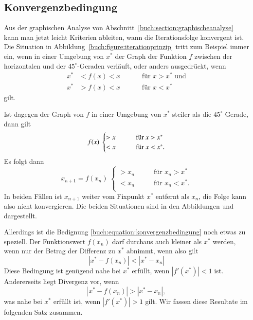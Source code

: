 %
%
\subsection{Konvergenzbedingung
\label{buch:subsection:konvergenzbedingung}}


Aus der graphischen Analyse von Abschnitt~\ref{buch:section:graphischeanalyse}
kann man jetzt leicht Kriterien ableiten, wann die Iterationsfolge
konvergent ist.
Die Situation in Abbildung~\ref{buch:figure:iterationprinzip}
tritt zum Beispiel immer ein, wenn in einer Umgebung von $x^*$ 
der Graph der Funktion $f$ zwischen der horizontalen und der 
$45^\circ$-Geraden verläuft, oder anders ausgedrückt, wenn
\[
\begin{aligned}
x^* &< f(x) < x &&& &\text{für $x>x^*$ und} \\
x^* &> f(x) < x &&& &\text{für $x<x^*$}
\end{aligned}
\]
gilt.

Ist dagegen der Graph von $f$ in einer Umgebung von $x^*$ steiler als
die $45^\circ$-Gerade, dann gilt 
\begin{equation}
f(x) \;\begin{cases}
> x&\qquad\text{für $ x>x^*$}\\
< x&\qquad\text{für $ x<x^*$.}
\end{cases}
\label{buch:equation:konvergenzbedingung}
\end{equation}
Es folgt dann
\[
x_{n+1} = f(x_n)
\;
\begin{cases}
> x_n&\qquad \text{für $x_n>x^*$}\\
< x_n&\qquad \text{für $x_n<x^*$.}\\
\end{cases}
\]
In beiden Fällen ist $x_{n+1}$ weiter vom Fixpunkt $x^*$ entfernt
als $x_n$, die Folge kann also nicht konvergieren.
Die beiden Situationen sind in den Abbildungen
\label{buch:figure:fixpunkt:normal} und
\label{buch:figure:fixpunkt:divergent}
dargestellt.

Allerdings ist die Bedignung \ref{buch:equation:konvergenzbedingung}
noch etwas zu speziell.
Der Funktionswert $f(x_n)$ darf durchaus auch kleiner als $x^*$ werden,
wenn nur der Betrag der Differenz zu $x^*$ abnimmt, wenn also gilt
\begin{equation}
|x^* - f(x_n)| < |x^*-x_n|
\label{buch:equation:konvergenzbereich}
\end{equation}
Diese Bedingung ist genügend nahe bei $x^*$ erfüllt, wenn
$|f'(x^*)| < 1$ ist.
Andererseits liegt Divergenz vor, wenn 
\[
|x^* - f(x_n)| > |x^*-x_n|,
\]
was nahe bei $x^*$ erfüllt ist, wenn $|f'(x^*)|>1$ gilt.
Wir fassen diese Resultate im folgenden Satz zusammen.

